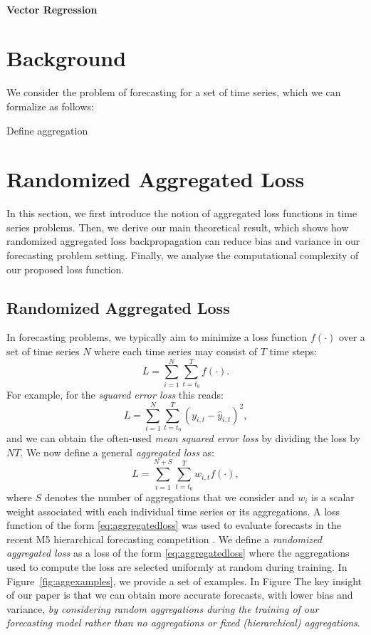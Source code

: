 \documentclass{article}
\begin{document}
  \paragraph{Vector Regression} 


\section{Background}
  \label{sec:background}
  We consider the problem of forecasting for a set of time series, which we can formalize as follows:

  Define aggregation

\section{Randomized Aggregated Loss}
  \label{sec:ralf}
  In this section, we first introduce the notion of aggregated loss functions in time series problems. Then, we derive our main theoretical result, which shows how randomized aggregated loss backpropagation can reduce bias and variance in our forecasting problem setting. Finally, we analyse the computational complexity of our proposed loss function.

  \subsection{Randomized Aggregated Loss}
    \label{subsec:ral}
    In forecasting problems, we typically aim to minimize a loss function \(f(\cdot)\) over a set of time series \(N\) where each time series may consist of \(T\) time steps: 
    \begin{equation} \label{eq:scalarloss}
      L = \sum^N_{i=1} \sum_{t=t_0}^{T} f(\cdot). 
    \end{equation}
    For example, for the \textit{squared error loss} this reads:
    \begin{equation}
      L = \sum^N_{i=1} \sum_{t=t_0}^{T} (y_{i,t} - \hat{y}_{i, t})^2,
    \end{equation}
    and we can obtain the often-used \textit{mean squared error loss} by dividing the loss by \(NT\). We now define a general \textit{aggregated loss} as:
    \begin{equation} \label{eq:aggregatedloss}
      L = \sum^{N + S}_{i=1} \sum_{t=t_0}^{T} w_{i, t} f(\cdot),
    \end{equation}  
    where \(S\) denotes the number of aggregations that we consider and \(w_i\) is a scalar weight associated with each individual time series or its aggregations. A loss function of the form \eqref{eq:aggregatedloss} was used to evaluate forecasts in the recent M5 hierarchical forecasting competition \cite{makridakis_m5_2020}. We define a \textit{randomized aggregated loss} as a loss of the form \eqref{eq:aggregatedloss} where the aggregations used to compute the loss are selected uniformly at random during training. In Figure~\ref{fig:aggexamples}, we provide a set of examples. In Figure The key insight of our paper is that we can obtain more accurate forecasts, with lower bias and variance, \textit{by considering random aggregations during the training of our forecasting model rather than no aggregations or fixed (hierarchical) aggregations}.
\end{document}
